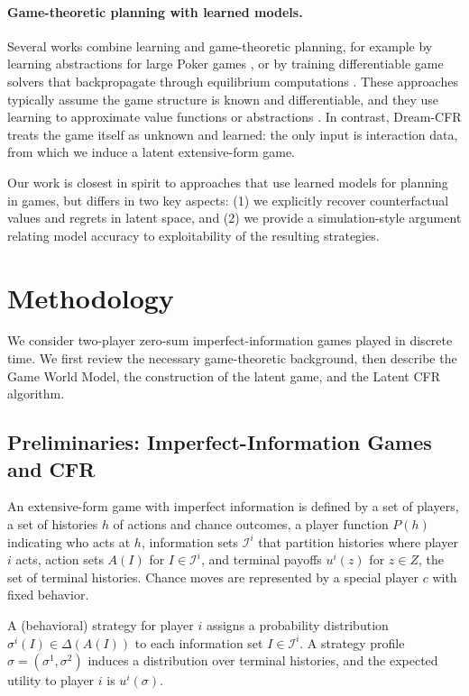 \documentclass{article}
\begin{document}
\paragraph{Game-theoretic planning with learned models.}
Several works combine learning and game-theoretic planning, for example by learning abstractions for large Poker games \cite{brown2020combining}, or by training differentiable game solvers that backpropagate through equilibrium computations \cite{schmid2021rebel}. These approaches typically assume the game structure is known and differentiable, and they use learning to approximate value functions or abstractions \cite{ye2020mastering}. In contrast, Dream-CFR treats the game itself as unknown and learned: the only input is interaction data, from which we induce a latent extensive-form game.

Our work is closest in spirit to approaches that use learned models for planning in games, but differs in two key aspects: (1) we explicitly recover counterfactual values and regrets in latent space, and (2) we provide a simulation-style argument relating model accuracy to exploitability of the resulting strategies.

\section{Methodology}
\label{sec:method}

We consider two-player zero-sum imperfect-information games played in discrete time. We first review the necessary game-theoretic background, then describe the Game World Model, the construction of the latent game, and the Latent CFR algorithm.

\subsection{Preliminaries: Imperfect-Information Games and CFR}

An extensive-form game with imperfect information is defined by a set of players, a set of histories $h$ of actions and chance outcomes, a player function $P(h)$ indicating who acts at $h$, information sets $\mathcal{I}^i$ that partition histories where player $i$ acts, action sets $A(I)$ for $I \in \mathcal{I}^i$, and terminal payoffs $u^i(z)$ for $z \in Z$, the set of terminal histories. Chance moves are represented by a special player $c$ with fixed behavior.

A (behavioral) strategy for player $i$ assigns a probability distribution $\sigma^i(I) \in \Delta(A(I))$ to each information set $I \in \mathcal{I}^i$. A strategy profile $\sigma = (\sigma^1, \sigma^2)$ induces a distribution over terminal histories, and the expected utility to player $i$ is $u^i(\sigma)$.
\end{document}
